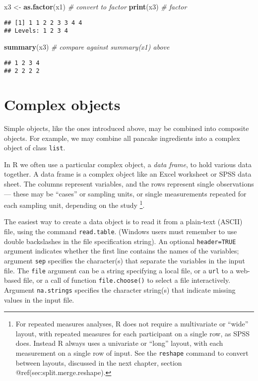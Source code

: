 \documentclass[]{book}
\newenvironment{Shaded}{\begin{snugshade}}{\end{snugshade}}
\newcommand{\CommentTok}[1]{\textcolor[rgb]{0.56,0.35,0.01}{\textit{#1}}}
\newcommand{\KeywordTok}[1]{\textcolor[rgb]{0.13,0.29,0.53}{\textbf{#1}}}
\newcommand{\NormalTok}[1]{#1}
\newcommand{\StringTok}[1]{\textcolor[rgb]{0.31,0.60,0.02}{#1}}
\begin{document}
\begin{Shaded}
\begin{Highlighting}[]
\NormalTok{x3 <-}\StringTok{ }\KeywordTok{as.factor}\NormalTok{(x1) }\CommentTok{# convert to factor}
\KeywordTok{print}\NormalTok{(x3) }\CommentTok{# factor}
\end{Highlighting}
\end{Shaded}

\begin{verbatim}
## [1] 1 1 2 2 3 3 4 4
## Levels: 1 2 3 4
\end{verbatim}

\begin{Shaded}
\begin{Highlighting}[]
\KeywordTok{summary}\NormalTok{(x3) }\CommentTok{# compare against summary(x1) above }
\end{Highlighting}
\end{Shaded}

\begin{verbatim}
## 1 2 3 4 
## 2 2 2 2
\end{verbatim}

\hypertarget{sec:complex.objects}{%
\section{Complex objects}\label{sec:complex.objects}}

Simple objects, like the ones introduced above, may be combined into
composite objects. For example, we may combine all pancake ingredients
into a complex object of class \texttt{list}.

In R we often use a particular complex object, a \emph{data
frame}, to hold various data together. A data frame is a complex object
like an Excel worksheet or SPSS data sheet. The columns represent
variables, and the rows represent single observations --- these may be
``cases'' or sampling units, or single measurements repeated for each
sampling unit, depending on the study
\footnote{For repeated measures analyses, R does not require a multivariate or ``wide'' layout, with repeated measures for each participant on a single row, as SPSS does. Instead R always uses a univariate or ``long'' layout, with each measurement on a single row of input. See the \texttt{reshape} command to convert between layouts, discussed in the next chapter, section @ref(sec:split.merge.reshape).}.

The easiest way to create a data object is to read it from a plain-text
(ASCII) file, using the command \texttt{read.table}.
(Windows users must remember to use double backslashes in the file
specification string). An optional \texttt{header=TRUE}
argument indicates whether the first line contains the names of the
variables; argument \texttt{sep} specifies the
character(s) that separate the variables in the input file. The
\texttt{file} argument can be a string specifying a
local file, or a \texttt{url} to a web-based file, or a
call of function \texttt{file.choose()} to select a file
interactively. Argument \texttt{na.strings} specifies
the character string(s) that indicate missing values in the input file.
\end{document}
